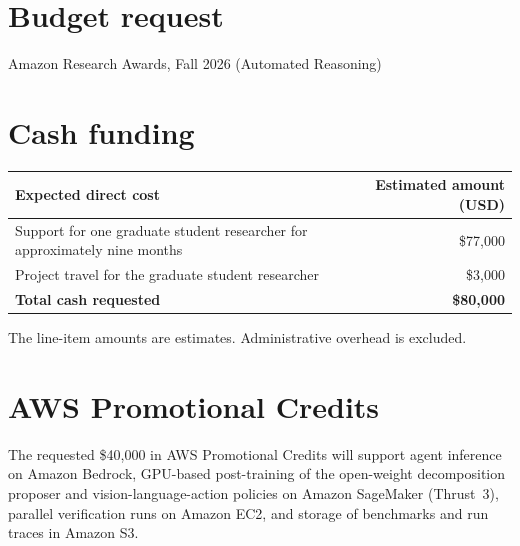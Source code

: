 \documentclass[11pt,letterpaper]{article}
\begin{document}


\section{Budget request}
Amazon Research Awards, Fall 2026 (Automated Reasoning)

\section{Cash funding}
\begin{tabularx}{\textwidth}{@{}Xr@{}}
\toprule
\textbf{Expected direct cost} & \textbf{Estimated amount (USD)} \\
\midrule
Support for one graduate student researcher for approximately nine months & \$77,000 \\
Project travel for the graduate student researcher & \$3,000 \\
\midrule
\textbf{Total cash requested} & \textbf{\$80,000} \\
\bottomrule
\end{tabularx}

The line-item amounts are estimates. Administrative overhead is excluded.

\section{AWS Promotional Credits}
The requested \$40,000 in AWS Promotional Credits will support agent inference on Amazon Bedrock, GPU-based post-training of the open-weight decomposition proposer and vision-language-action policies on Amazon SageMaker (Thrust~3), parallel verification runs on Amazon EC2, and storage of benchmarks and run traces in Amazon S3.
\end{document}
